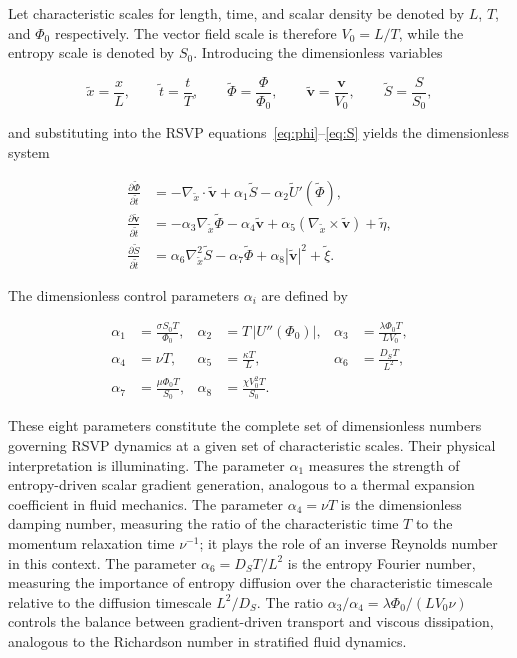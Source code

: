 \documentclass[12pt]{article}
\begin{document}
Let characteristic scales for length, time, and scalar density be denoted by $L$, $T$, and $\Phi_0$ respectively. The vector field scale is therefore $V_0 = L/T$, while the entropy scale is denoted by $S_0$. Introducing the dimensionless variables

\begin{equation}
\tilde{x} = \frac{x}{L}, \qquad
\tilde{t} = \frac{t}{T}, \qquad
\tilde{\Phi} = \frac{\Phi}{\Phi_0}, \qquad
\tilde{\mathbf{v}} = \frac{\mathbf{v}}{V_0}, \qquad
\tilde{S} = \frac{S}{S_0},
\end{equation}

and substituting into the RSVP equations~\eqref{eq:phi}--\eqref{eq:S} yields the dimensionless system

\begin{align}
\frac{\partial \tilde{\Phi}}{\partial \tilde{t}} &=
-\nabla_{\tilde{x}} \cdot \tilde{\mathbf{v}}
+ \alpha_1 \tilde{S}
- \alpha_2 \tilde{U}'(\tilde{\Phi}),
\label{eq:dimless_phi} \\
\frac{\partial \tilde{\mathbf{v}}}{\partial \tilde{t}} &=
-\alpha_3 \nabla_{\tilde{x}} \tilde{\Phi}
- \alpha_4 \tilde{\mathbf{v}}
+ \alpha_5 (\nabla_{\tilde{x}} \times \tilde{\mathbf{v}})
+ \tilde{\eta},
\label{eq:dimless_v} \\
\frac{\partial \tilde{S}}{\partial \tilde{t}} &=
\alpha_6 \nabla_{\tilde{x}}^2 \tilde{S}
- \alpha_7 \tilde{\Phi}
+ \alpha_8 |\tilde{\mathbf{v}}|^2
+ \tilde{\xi}.
\label{eq:dimless_S}
\end{align}

The dimensionless control parameters $\alpha_i$ are defined by

\begin{align}
\alpha_1 &= \frac{\sigma S_0 T}{\Phi_0}, &
\alpha_2 &= T \,|U''(\Phi_0)|, &
\alpha_3 &= \frac{\lambda \Phi_0 T}{L V_0}, \nonumber \\
\alpha_4 &= \nu T, &
\alpha_5 &= \frac{\kappa T}{L}, &
\alpha_6 &= \frac{D_S T}{L^2}, \nonumber \\
\alpha_7 &= \frac{\mu \Phi_0 T}{S_0}, &
\alpha_8 &= \frac{\chi V_0^2 T}{S_0}.
\end{align}

These eight parameters constitute the complete set of dimensionless numbers governing RSVP dynamics at a given set of characteristic scales. Their physical interpretation is illuminating. The parameter $\alpha_1$ measures the strength of entropy-driven scalar gradient generation, analogous to a thermal expansion coefficient in fluid mechanics. The parameter $\alpha_4 = \nu T$ is the dimensionless damping number, measuring the ratio of the characteristic time $T$ to the momentum relaxation time $\nu^{-1}$; it plays the role of an inverse Reynolds number in this context. The parameter $\alpha_6 = D_S T / L^2$ is the entropy Fourier number, measuring the importance of entropy diffusion over the characteristic timescale relative to the diffusion timescale $L^2/D_S$. The ratio $\alpha_3 / \alpha_4 = \lambda \Phi_0 / (L V_0 \nu)$ controls the balance between gradient-driven transport and viscous dissipation, analogous to the Richardson number in stratified fluid dynamics.
\end{document}
